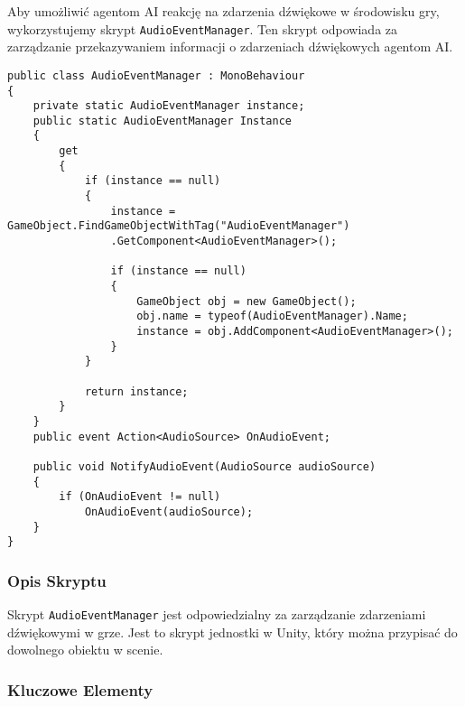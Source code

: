 Aby umożliwić agentom AI reakcję na zdarzenia dźwiękowe w środowisku gry, wykorzystujemy skrypt \texttt{AudioEventManager}. Ten skrypt odpowiada za zarządzanie przekazywaniem informacji o zdarzeniach dźwiękowych agentom AI.

\begin{codebox}
\begin{lstlisting}[language={[Sharp]C}, label={listing:AudioEventManager.cs}]
public class AudioEventManager : MonoBehaviour
{
    private static AudioEventManager instance;
    public static AudioEventManager Instance
    {
        get
        {
            if (instance == null)
            {
                instance = GameObject.FindGameObjectWithTag("AudioEventManager")
                .GetComponent<AudioEventManager>();
                
                if (instance == null)
                {
                    GameObject obj = new GameObject();
                    obj.name = typeof(AudioEventManager).Name;
                    instance = obj.AddComponent<AudioEventManager>();
                }
            }
            
            return instance;
        }
    }
    public event Action<AudioSource> OnAudioEvent;
    
    public void NotifyAudioEvent(AudioSource audioSource)
    {
        if (OnAudioEvent != null)
            OnAudioEvent(audioSource);
    }
}
\end{lstlisting}
\end{codebox}

\subsubsection{Opis Skryptu}

Skrypt \texttt{AudioEventManager} jest odpowiedzialny za zarządzanie zdarzeniami dźwiękowymi w grze. Jest to skrypt jednostki w Unity, który można przypisać do dowolnego obiektu w scenie.

\subsubsection{Kluczowe Elementy}

